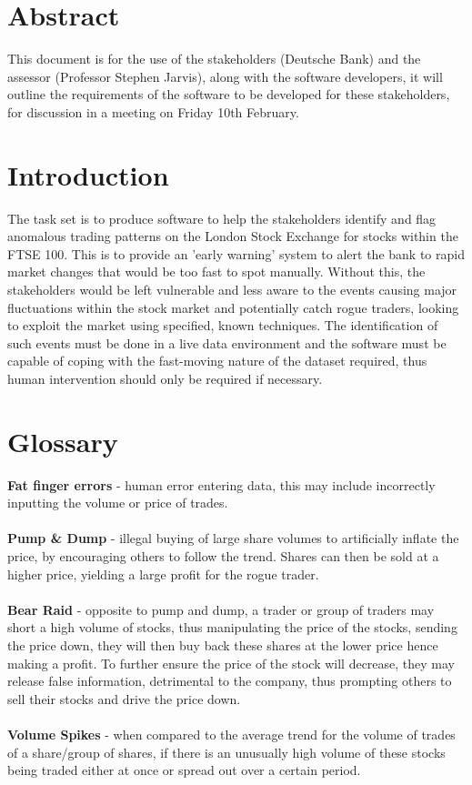 \documentclass[11pt, oneside, a4paper]{article}
\begin{document}
\clearpage
\maketitle

\newpage
\setcounter{page}{1}

\section{Abstract}
This document is for the use of the stakeholders (Deutsche Bank) and the assessor (Professor Stephen Jarvis),
along with the software developers, it will outline the requirements of the software to be developed for
these stakeholders, for discussion in a meeting on Friday 10th February.

\section{Introduction}
The task set is to produce software to help the stakeholders identify and flag anomalous trading patterns
on the London Stock Exchange for stocks within the FTSE 100. This is to provide an 'early warning' system
to alert the bank to rapid market changes that would be too fast to spot manually. Without this, the
stakeholders would be left vulnerable and less aware to the events causing major fluctuations within the
stock market and potentially catch rogue traders, looking to exploit the market using specified, known
techniques. The identification of such events must be done in a live data environment and the software
must be capable of coping with the fast-moving nature of the dataset required, thus human intervention
should only be required if necessary.

\section{Glossary}
\textbf{Fat finger errors} - human error entering data, this may include incorrectly inputting the volume
or price of trades. \\\\
\textbf{Pump \& Dump} - illegal buying of large share volumes to artificially inflate the price, by encouraging
others to follow the trend. Shares can then be sold at a higher price, yielding a large profit for the rogue trader. \\\\
\textbf{Bear Raid} - opposite to pump and dump, a trader or group of traders may short a high volume of stocks,
thus manipulating the price of the stocks, sending the price down, they will then buy back these shares at the
lower price hence making a profit. To further ensure the price of the stock will decrease, they may release false
information, detrimental to the company, thus prompting others to sell their stocks and drive the price down. \\\\
\textbf{Volume Spikes} - when compared to the average trend for the volume of trades of a share/group of shares,
if there is an unusually high volume of these stocks being traded either at once or spread out over a certain period. \\\\
\end{document}
